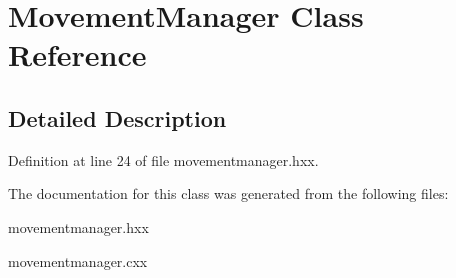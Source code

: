 \hypertarget{classMovementManager}{\section{Movement\-Manager Class Reference}
\label{classMovementManager}
}


\subsection{Detailed Description}


Definition at line 24 of file movementmanager.\-hxx.



The documentation for this class was generated from the following files\-:\begin{DoxyCompactItemize}
\item 
movementmanager.\-hxx\item 
movementmanager.\-cxx\end{DoxyCompactItemize}
